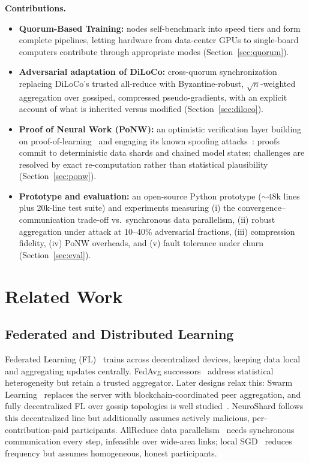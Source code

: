 \documentclass[conference]{IEEEtran}
\begin{document}
\smallskip\noindent\textbf{Contributions.}
\begin{itemize}
    \item \textbf{Quorum-Based Training:} nodes self-benchmark into speed tiers and form complete pipelines, letting hardware from data-center GPUs to single-board computers contribute through appropriate modes (Section~\ref{sec:quorum}).
    \item \textbf{Adversarial adaptation of DiLoCo:} cross-quorum synchronization replacing DiLoCo's trusted all-reduce with Byzantine-robust, $\sqrt{n}$-weighted aggregation over gossiped, compressed pseudo-gradients, with an explicit account of what is inherited versus modified (Section~\ref{sec:diloco}).
    \item \textbf{Proof of Neural Work (PoNW):} an optimistic verification layer building on proof-of-learning~\cite{jia2021proof} and engaging its known spoofing attacks~\cite{zhang2022adversarial,fang2023proof}: proofs commit to deterministic data shards and chained model states; challenges are resolved by exact re-computation rather than statistical plausibility (Section~\ref{sec:ponw}).
    \item \textbf{Prototype and evaluation:} an open-source Python prototype (${\sim}48$k lines plus 20k-line test suite) and experiments measuring (i) the convergence--communication trade-off vs.\ synchronous data parallelism, (ii) robust aggregation under attack at 10--40\% adversarial fractions, (iii) compression fidelity, (iv) PoNW overheads, and (v) fault tolerance under churn (Section~\ref{sec:eval}).
\end{itemize}

\section{Related Work}

\subsection{Federated and Distributed Learning}

Federated Learning (FL)~\cite{mcmahan2017communication} trains across decentralized devices, keeping data local and aggregating updates centrally. FedAvg successors~\cite{karimireddy2020scaffold} address statistical heterogeneity but retain a trusted aggregator. Later designs relax this: Swarm Learning~\cite{warnat2021swarm} replaces the server with blockchain-coordinated peer aggregation, and fully decentralized FL over gossip topologies is well studied~\cite{kairouz2021advances}. NeuroShard follows this decentralized line but additionally assumes actively malicious, per-contribution-paid participants. AllReduce data parallelism~\cite{goyal2017accurate} needs synchronous communication every step, infeasible over wide-area links; local SGD~\cite{stich2019local} reduces frequency but assumes homogeneous, honest participants.
\end{document}
